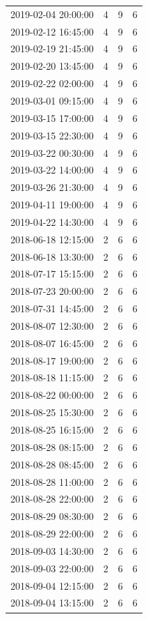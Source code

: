 \begin{tabular}{lrrr}
2019-02-04 20:00:00 & 4 & 9 & 6 \\
2019-02-12 16:45:00 & 4 & 9 & 6 \\
2019-02-19 21:45:00 & 4 & 9 & 6 \\
2019-02-20 13:45:00 & 4 & 9 & 6 \\
2019-02-22 02:00:00 & 4 & 9 & 6 \\
2019-03-01 09:15:00 & 4 & 9 & 6 \\
2019-03-15 17:00:00 & 4 & 9 & 6 \\
2019-03-15 22:30:00 & 4 & 9 & 6 \\
2019-03-22 00:30:00 & 4 & 9 & 6 \\
2019-03-22 14:00:00 & 4 & 9 & 6 \\
2019-03-26 21:30:00 & 4 & 9 & 6 \\
2019-04-11 19:00:00 & 4 & 9 & 6 \\
2019-04-22 14:30:00 & 4 & 9 & 6 \\
2018-06-18 12:15:00 & 2 & 6 & 6 \\
2018-06-18 13:30:00 & 2 & 6 & 6 \\
2018-07-17 15:15:00 & 2 & 6 & 6 \\
2018-07-23 20:00:00 & 2 & 6 & 6 \\
2018-07-31 14:45:00 & 2 & 6 & 6 \\
2018-08-07 12:30:00 & 2 & 6 & 6 \\
2018-08-07 16:45:00 & 2 & 6 & 6 \\
2018-08-17 19:00:00 & 2 & 6 & 6 \\
2018-08-18 11:15:00 & 2 & 6 & 6 \\
2018-08-22 00:00:00 & 2 & 6 & 6 \\
2018-08-25 15:30:00 & 2 & 6 & 6 \\
2018-08-25 16:15:00 & 2 & 6 & 6 \\
2018-08-28 08:15:00 & 2 & 6 & 6 \\
2018-08-28 08:45:00 & 2 & 6 & 6 \\
2018-08-28 11:00:00 & 2 & 6 & 6 \\
2018-08-28 22:00:00 & 2 & 6 & 6 \\
2018-08-29 08:30:00 & 2 & 6 & 6 \\
2018-08-29 22:00:00 & 2 & 6 & 6 \\
2018-09-03 14:30:00 & 2 & 6 & 6 \\
2018-09-03 22:00:00 & 2 & 6 & 6 \\
2018-09-04 12:15:00 & 2 & 6 & 6 \\
2018-09-04 13:15:00 & 2 & 6 & 6 \\

\end{tabular}
